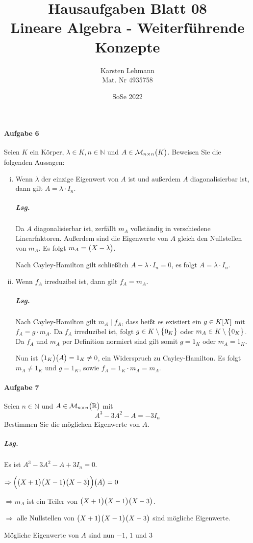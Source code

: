 \documentclass{scrreprt}
\author{Karsten Lehmann\\Mat. Nr 4935758}
\date{SoSe 2022}
\title{Hausaufgaben Blatt 08\\Lineare Algebra - Weiterführende Konzepte}
\begin{document}
\paragraph{Aufgabe 6} Seien $K$ ein Körper, $\lambda \in K, n \in \mathbb{N}$ und
$A \in \mathcal{M}_{n \times n}\qty\big(K)$.
Beweisen Sie die folgenden Aussagen:
\begin{enumerate}[(i)]
\item Wenn $\lambda$ der einzige Eigenwert von $A$ ist und außerdem $A$
  diagonalisierbar ist, dann gilt $A = \lambda \cdot I_n$.

  \subparagraph{Lsg.} Da $A$ diagonalisierbar ist, zerfällt $m_A$ vollständig in
  verschiedene Linearfaktoren.
  Außerdem sind die Eigenwerte von $A$ gleich den Nullstellen von $m_A$.
  Es folgt $m_A = \qty\big(X - \lambda)$.

  Nach Cayley-Hamilton gilt schließlich $A - \lambda \cdot I_n = 0$, es folgt
  $A = \lambda \cdot I_n$.

\item Wenn $f_A$ irreduzibel ist, dann gilt $f_A = m_A$.

  \subparagraph{Lsg.} Nach Cayley-Hamilton gilt $m_A \mid f_A$,
  dass heißt es existiert ein $g \in K\qty[X]$ mit
  $f_A = g \cdot m_A$.
  Da $f_A$ irreduzibel ist, folgt $g \in K \setminus \qty\big{0_K}$ oder
  $m_A \in K \setminus \qty\big{0_K}$.
  Da $f_A$ und $m_A$ per Definition normiert sind gilt somit $g = 1_K$ oder
  $m_A = 1_K$.

  Nun ist $\qty\big(1_K)\qty\big(A) = 1_K \ne 0$, ein Widerspruch zu
  Cayley-Hamilton.
  Es folgt $m_A \ne 1_K$ und $g = 1_K$, sowie $f_A = 1_K \cdot m_A = m_A$.
\end{enumerate}

\paragraph{Aufgabe 7} Seien $n \in \mathbb{N}$ und
$A \in \mathcal{M}_{n \times n}\qty\big(\mathbb{R})$ mit
\[
  A^3 - 3A^2 -A = -3I_n
\]
Bestimmen Sie die möglichen Eigenwerte von $A$.

\subparagraph{Lsg.} Es ist $A^3 - 3A^2 - A + 3I_n = 0$.

$\Rightarrow \qty\Big(
  \qty\big(X + 1)\qty\big(X - 1)\qty\big(X - 3)
)\qty\big(A) = 0$

$\Rightarrow m_A$ ist ein Teiler von
$\qty\big(X + 1)\qty\big(X - 1)\qty\big(X - 3)$.

$\Rightarrow$ alle Nullstellen von
$\qty\big(X + 1)\qty\big(X - 1)\qty\big(X - 3)$ sind mögliche Eigenwerte.

Mögliche Eigenwerte von $A$ sind nun $-1$, $1$ und $3$
\end{document}
